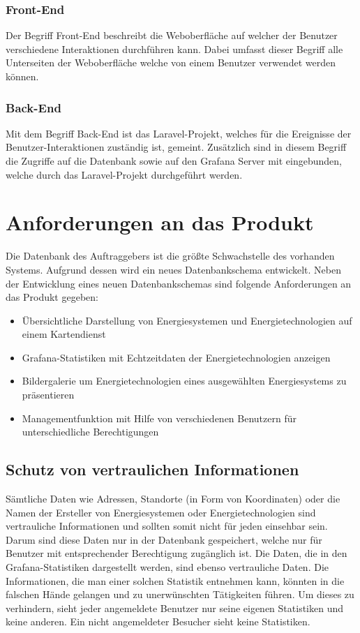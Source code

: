 \subsubsection{Front-End} \label{sec:Front-End}
Der Begriff Front-End beschreibt die Weboberfläche auf welcher der Benutzer verschiedene Interaktionen durchführen kann. Dabei umfasst dieser Begriff alle Unterseiten der Weboberfläche welche von einem Benutzer verwendet werden können.


\subsubsection{Back-End} \label{sec:Back-End}
Mit dem Begriff Back-End ist das Laravel-Projekt, welches für die Ereignisse der Benutzer-Interaktionen zuständig ist, gemeint. Zusätzlich sind in diesem Begriff die Zugriffe auf die Datenbank sowie auf den Grafana Server mit eingebunden, welche durch das Laravel-Projekt durchgeführt werden.

\newpage
\section{Anforderungen an das Produkt}
Die Datenbank des Auftraggebers ist die größte Schwachstelle des vorhanden Systems.
Aufgrund dessen wird ein neues Datenbankschema entwickelt. Neben der Entwicklung eines neuen Datenbankschemas sind folgende Anforderungen an das Produkt gegeben:

\begin{itemize}
	\item Übersichtliche Darstellung von Energiesystemen und Energietechnologien auf einem Kartendienst
	\item Grafana-Statistiken mit Echtzeitdaten der Energietechnologien anzeigen
	\item Bildergalerie um Energietechnologien eines ausgewählten Energiesystems zu präsentieren
	\item Managementfunktion mit Hilfe von verschiedenen Benutzern für unterschiedliche Berechtigungen
\end{itemize}


\subsection{Schutz von vertraulichen Informationen}
Sämtliche Daten wie Adressen, Standorte (in Form von Koordinaten) oder die Namen der Ersteller von Energiesystemen oder Energietechnologien sind vertrauliche Informationen und sollten somit nicht für jeden einsehbar sein. Darum sind diese Daten nur in der Datenbank gespeichert, welche nur für Benutzer mit entsprechender Berechtigung zugänglich ist. Die Daten, die in den Grafana-Statistiken dargestellt werden, sind ebenso vertrauliche Daten. Die Informationen, die man einer solchen Statistik entnehmen kann, könnten in die falschen Hände gelangen und zu unerwünschten Tätigkeiten führen. Um dieses zu verhindern, sieht jeder angemeldete Benutzer nur seine eigenen Statistiken und keine anderen. Ein nicht angemeldeter Besucher sieht keine Statistiken.


